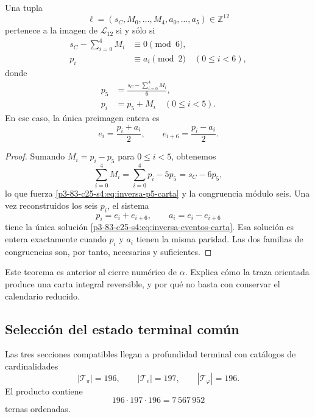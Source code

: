\begin{theorem}
\label{p3-83-c25-s4:thm:inversion-carta-integral-156}
Una tupla
\[
 \ell=(s_C,M_0,\ldots,M_4,a_0,\ldots,a_5)\in\mathbb Z^{12}
\]
pertenece a la imagen de \(\mathcal L_{12}\) si y sólo si
\begin{align}
 s_C-\sum_{i=0}^{4}M_i&\equiv0\pmod6,
 \label{p3-83-c25-s4:eq:congruencia-seis-carta}\\
 p_i&\equiv a_i\pmod2
 \quad(0\leq i<6),
 \label{p3-83-c25-s4:eq:congruencia-paridad-carta}
\end{align}
donde
\begin{align}
 p_5&=\frac{s_C-\sum_{i=0}^{4}M_i}{6},
 \label{p3-83-c25-s4:eq:inversa-p5-carta}\\
 p_i&=p_5+M_i\quad(0\leq i<5).
 \label{p3-83-c25-s4:eq:inversa-pi-carta}
\end{align}
En ese caso, la única preimagen entera es
\begin{equation}
 e_i=\frac{p_i+a_i}{2},
 \qquad
 e_{i+6}=\frac{p_i-a_i}{2}.
 \label{p3-83-c25-s4:eq:inversa-eventos-carta}
\end{equation}
\end{theorem}

\begin{proof}
Sumando \(M_i=p_i-p_5\) para \(0\leq i<5\), obtenemos
\[
 \sum_{i=0}^{4}M_i
 =\sum_{i=0}^{4}p_i-5p_5
 =s_C-6p_5,
\]
lo que fuerza \eqref{p3-83-c25-s4:eq:inversa-p5-carta} y la congruencia módulo seis.
Una vez reconstruidos los seis \(p_i\), el sistema
\[
 p_i=e_i+e_{i+6},
 \qquad a_i=e_i-e_{i+6}
\]
tiene la única solución \eqref{p3-83-c25-s4:eq:inversa-eventos-carta}. Esa solución es
entera exactamente cuando \(p_i\) y \(a_i\) tienen la misma paridad.
Las dos familias de congruencias son, por tanto, necesarias y suficientes.
\end{proof}

Este teorema es anterior al cierre numérico de \(\alpha\). Explica cómo la
traza orientada produce una carta integral reversible, y por qué no basta
con conservar el calendario reducido.

\subsection{Selección del estado terminal común}

Las tres secciones compatibles llegan a profundidad terminal con catálogos
de cardinalidades
\[
 |\mathcal T_\pi|=196,
 \qquad
 |\mathcal T_e|=197,
 \qquad
 |\mathcal T_\varphi|=196.
\]
El producto contiene
\begin{equation}
 196\cdot197\cdot196=7\,567\,952
 \label{p3-83-c25-s4:eq:cardinal-producto-terminal}
\end{equation}
ternas ordenadas.

